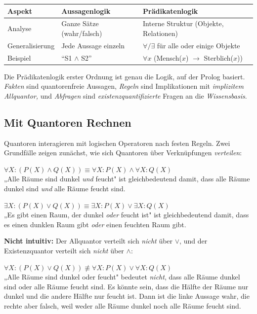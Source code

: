 \documentclass[parskip=half,a4paper,11pt]{scrreprt}
\begin{document}
\begin{tabular}{lll}
\toprule
\textbf{Aspekt} & \textbf{Aussagenlogik} & \textbf{Prädikatenlogik} \\
\midrule
Analyse & Ganze Sätze (wahr/falsch) & Interne Struktur (Objekte, Relationen) \\

Generalisierung & Jede Aussage einzeln & $\forall/\exists$ für alle oder einige Objekte \\

Beispiel & ``S1 $\wedge$ S2'' & $\forall x$ (Mensch($x$) $\rightarrow$ Sterblich($x$)) \\
\bottomrule
\end{tabular}
\vspace{1cm}
Die Prädikatenlogik erster Ordnung ist genau die Logik, auf der Prolog basiert.\textit{ Fakten }sind quantorenfreie Aussagen, \textit{Regeln }sind Implikationen mit\textit{ implizitem Allquantor,} und \textit{Abfragen} sind \textit{existenzquantifizierte} Fragen an die \textit{Wissensbasis}.

\subsection{Mit Quantoren Rechnen}

Quantoren interagieren mit logischen Operatoren nach festen Regeln. Zwei Grundfälle zeigen zunächst, wie sich Quantoren über Verknüpfungen \textit{verteilen}:

$\forall X\colon (P(X) \land Q(X)) \equiv \forall X\colon P(X) \land \forall X\colon Q(X)$\\
„Alle Räume sind dunkel \textit{und} feucht" ist gleichbedeutend damit, dass alle Räume dunkel sind \textit{und} alle Räume feucht sind.

$\exists X\colon (P(X) \lor Q(X)) \equiv \exists X\colon P(X) \lor \exists X\colon Q(X)$\\
„Es gibt einen Raum, der dunkel \textit{oder} feucht ist" ist gleichbedeutend damit, dass es einen dunklen Raum gibt \textit{oder} einen feuchten Raum gibt.

\textbf{Nicht intuitiv:} Der Allquantor verteilt sich \textit{nicht} über $\lor$, und der Existenzquantor verteilt sich \textit{nicht} über $\land$:

$\forall X\colon (P(X) \lor Q(X)) \not\equiv \forall X\colon P(X) \lor \forall X\colon Q(X)$\\
„Alle Räume sind dunkel oder feucht" bedeutet \textit{nicht}, dass alle Räume dunkel sind oder alle Räume feucht sind. Es könnte sein, dass die Hälfte der Räume nur dunkel und die andere Hälfte nur feucht ist. Dann ist die linke Aussage wahr, die rechte aber falsch, weil weder alle Räume dunkel noch alle Räume feucht sind.
\end{document}
